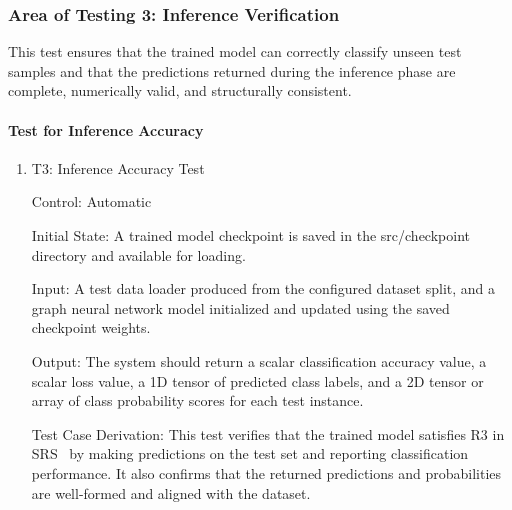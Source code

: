 \documentclass[12pt, titlepage]{article}
\begin{document}
\subsubsection{Area of Testing 3: Inference Verification}
This test ensures that the trained model can correctly classify unseen test samples and that the predictions returned during the inference phase are complete, numerically valid, and structurally consistent.

\paragraph{Test for Inference Accuracy}

\begin{enumerate}

\item{T3: Inference Accuracy Test\\}

Control: Automatic

Initial State: A trained model checkpoint is saved in the src/checkpoint directory and available for loading.

Input: A test data loader produced from the configured dataset split, and a graph neural network model initialized and updated using the saved checkpoint weights.

Output: The system should return a scalar classification accuracy value, a scalar loss value, a 1D tensor of predicted class labels, and a 2D tensor or array of class probability scores for each test instance.

Test Case Derivation: This test verifies that the trained model satisfies R3 in SRS~\citep{Yuanqi_ReProtGNN_SRS} by making predictions on the test set and reporting classification performance. It also confirms that the returned predictions and probabilities are well-formed and aligned with the dataset.


\end{enumerate}
\end{document}
